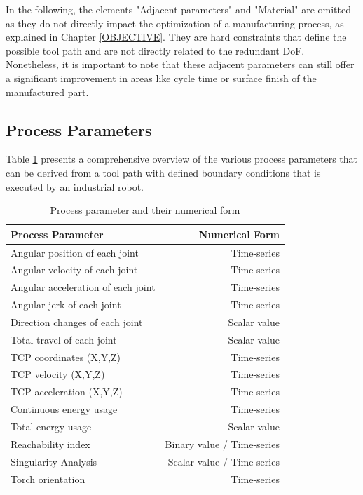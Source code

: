 In the following, the elements "Adjacent parameters" and "Material" are omitted as they do not directly impact the optimization of a manufacturing process, as explained in Chapter \ref{OBJECTIVE}. They are hard constraints that define the possible tool path and are not directly related to the redundant DoF. Nonetheless, it is important to note that these adjacent parameters can still offer a significant improvement in areas like cycle time or surface finish of the manufactured part.

\newpage
\subsection{Process Parameters}\label{pp}


Table \ref{procesparameters} presents a comprehensive overview of the various process parameters that can be derived from a tool path with defined boundary conditions that is executed by an industrial robot. 


\begin{table}[H]
	\centering
	\begin{tabular}{||l|r||}
		\hline
		Process Parameter & Numerical Form\\
		\hline
		\hline
		\hline
		Angular position of each joint & Time-series\\
		Angular velocity of each joint & Time-series\\
		Angular acceleration of each joint& Time-series\\
		Angular jerk of each joint& Time-series\\
		\hline
		\hline
		Direction changes of each joint& Scalar value\\
		Total travel of each joint& Scalar value\\
		\hline
		\hline	
		
		TCP coordinates (X,Y,Z) & Time-series\\
		TCP velocity (X,Y,Z) & Time-series\\
		TCP acceleration (X,Y,Z) & Time-series\\
		
		
		\hline
		\hline
		Continuous energy usage & Time-series\\
		Total energy usage & Scalar value\\
		\hline
		\hline
		Reachability index & Binary value / Time-series\\
		Singularity Analysis & Scalar value / Time-series\\
		Torch orientation & Time-series\\
		
		
		\hline
		\hline
		
	\end{tabular}
	
	
	\caption{Process parameter and their numerical form}
	\label{procesparameters}
\end{table}

